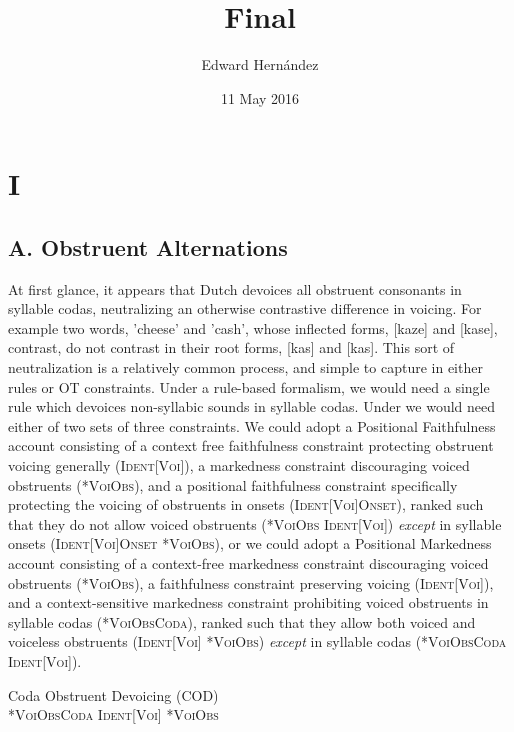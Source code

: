 \documentclass[doc,12pt]{apa6}
\begin{document}
\title{Final}
\author{Edward Hern\'{a}ndez}
\date{11 May 2016}
\maketitle

\section{I}

\subsection{A. Obstruent Alternations}

At first glance, it appears that Dutch devoices all obstruent consonants in
syllable codas, neutralizing an otherwise contrastive difference in voicing.
For example two words, 'cheese' and 'cash', whose inflected forms, [kaze] and
[kase], contrast, do not contrast in their root forms, [kas] and [kas].  This
sort of neutralization is a relatively common process, and simple to capture in
either rules or OT constraints. Under a rule-based formalism, we would need a
single rule which devoices non-syllabic sounds in syllable codas. Under we
would need either of two sets of three constraints. We could adopt a Positional
Faithfulness account consisting of a context free faithfulness constraint
protecting obstruent voicing generally (\textsc{Ident[Voi]}), a markedness
constraint discouraging voiced obstruents (\textsc{*VoiObs}), and a positional
faithfulness constraint specifically protecting the voicing of obstruents in
onsets (\textsc{Ident[Voi]Onset}), ranked such that they do not allow voiced
obstruents (\textsc{*VoiObs {\OTdom} Ident[Voi]}) \emph{except} in syllable
onsets (\textsc{Ident[Voi]Onset {\OTdom} *VoiObs}), or we could adopt a
Positional Markedness account consisting of a context-free markedness
constraint discouraging voiced obstruents (\textsc{*VoiObs}), a faithfulness
constraint preserving voicing (\textsc{Ident[Voi]}), and a context-sensitive
markedness constraint prohibiting voiced obstruents in syllable codas
(\textsc{*VoiObsCoda}), ranked such that they allow both voiced and voiceless
obstruents (\textsc{Ident[Voi] {\OTdom} *VoiObs}) \emph{except} in syllable
codas (\textsc{*VoiObsCoda {\OTdom} Ident[Voi]}).

\begin{exe}
	\ex Coda Obstruent Devoicing (COD) \\
		\phonr{\phonfeat{- syl\\- son}}{\phonfeat{- voi}}{$]_\sigma$}
	\ex \textsc{*VoiObsCoda {\OTdom} Ident[Voi] {\OTdom} *VoiObs}
\end{exe}
\end{document}
